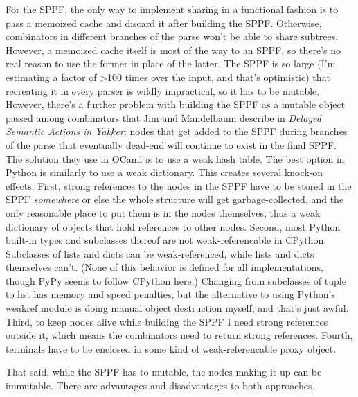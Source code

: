 \documentclass[12pt]{article}
\begin{document}
For the SPPF, the only way to implement sharing in a functional
fashion is to pass a memoized cache and discard it after building the
SPPF.  Otherwise, combinators in different branches of the parse won't
be able to share subtrees.  However, a memoized cache itself is most
of the way to an SPPF, so there's no real reason to use the former in
place of the latter.  The SPPF is so large (I'm estimating a factor of
>100 times over the input, and that's optimistic) that recreating it
in every parser is wildly impractical, so it has to be mutable.
However, there's a further problem with building the SPPF as a mutable
object passed among combinators that Jim and Mandelbaum describe in
\emph{Delayed Semantic Actions in Yakker}: nodes that get added to the
SPPF during branches of the parse that eventually dead-end will
continue to exist in the final SPPF.  The solution they use in OCaml
is to use a weak hash table.  The best option in Python is similarly
to use a weak dictionary.  This creates several knock-on effects.
First, strong references to the nodes in the SPPF have to be stored in
the SPPF \emph{somewhere} or else the whole structure will get
garbage-collected, and the only reasonable place to put them is in the
nodes themselves, thus a weak dictionary of objects that hold
references to other nodes.  Second, most Python built-in types and
subclasses thereof are not weak-referencable in CPython.  Subclasses
of lists and dicts can be weak-referenced, while lists and dicts
themselves can't.  (None of this behavior is defined for all
implementations, though PyPy seems to follow CPython here.)  Changing
from subclasses of tuple to list has memory and speed penalties, but
the alternative to using Python's weakref module is doing manual
object destruction myself, and that's just awful.  Third, to keep
nodes alive while building the SPPF I need strong references outside
it, which means the combinators need to return strong references.
Fourth, terminals have to be enclosed in some kind of
weak-referencable proxy object.

That said, while the SPPF has to mutable, the nodes making it up can
be immutable.  There are advantages and disadvantages to both
approaches.
\end{document}
